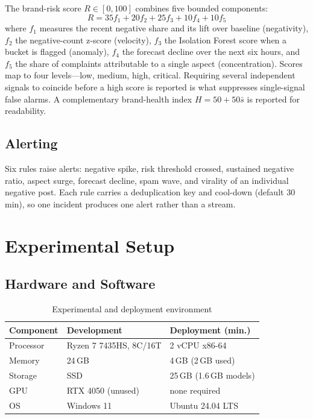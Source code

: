 \documentclass[conference]{IEEEtran}
\begin{document}
The brand-risk score $R \in [0,100]$ combines five bounded components:
\begin{equation}
R = 35 f_1 + 20 f_2 + 25 f_3 + 10 f_4 + 10 f_5
\end{equation}
where $f_1$ measures the recent negative share and its lift over baseline (negativity),
$f_2$ the negative-count z-score (velocity), $f_3$ the Isolation Forest score when a
bucket is flagged (anomaly), $f_4$ the forecast decline over the next six hours, and
$f_5$ the share of complaints attributable to a single aspect (concentration). Scores map
to four levels---low, medium, high, critical. Requiring several independent signals to
coincide before a high score is reported is what suppresses single-signal false alarms. A
complementary brand-health index $H = 50 + 50\bar{s}$ is reported for readability.

\subsection{Alerting}

Six rules raise alerts: negative spike, risk threshold crossed, sustained negative ratio,
aspect surge, forecast decline, spam wave, and virality of an individual negative post.
Each rule carries a deduplication key and cool-down (default 30\,min), so one incident
produces one alert rather than a stream.

\section{Experimental Setup}

\subsection{Hardware and Software}

\begin{table}[htbp]
\caption{Experimental and deployment environment}
\label{tab:hw}
\centering
\begin{tabular}{@{}lll@{}}
\toprule
\textbf{Component} & \textbf{Development} & \textbf{Deployment (min.)} \\
\midrule
Processor & Ryzen 7 7435HS, 8C/16T & 2 vCPU x86-64 \\
Memory    & 24\,GB                 & 4\,GB (2\,GB used) \\
Storage   & SSD                    & 25\,GB (1.6\,GB models) \\
GPU       & RTX 4050 (unused)      & none required \\
OS        & Windows 11             & Ubuntu 24.04 LTS \\
\bottomrule
\end{tabular}
\end{table}
\end{document}
